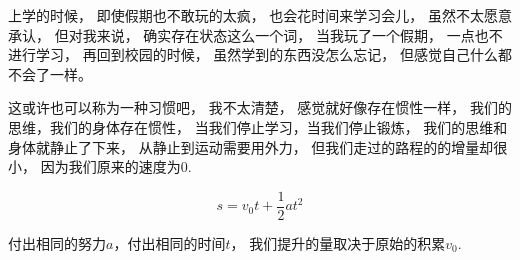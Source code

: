 上学的时候，
即使假期也不敢玩的太疯，
也会花时间来学习会儿，
虽然不太愿意承认，
但对我来说，
确实存在状态这么一个词，
当我玩了一个假期，
一点也不进行学习，
再回到校园的时候，
虽然学到的东西没怎么忘记，
但感觉自己什么都不会了一样。


这或许也可以称为一种习惯吧，
我不太清楚，
感觉就好像存在惯性一样，
我们的思维，我们的身体存在惯性，
当我们停止学习，当我们停止锻炼，
我们的思维和身体就静止了下来，
从静止到运动需要用外力，
但我们走过的路程的的增量却很小，
因为我们原来的速度为0.


\begin{equation}
  s = v_0t + \frac{1}{2}at^2
\end{equation}


付出相同的努力$a$，付出相同的时间$t$，
我们提升的量取决于原始的积累$v_0$.










